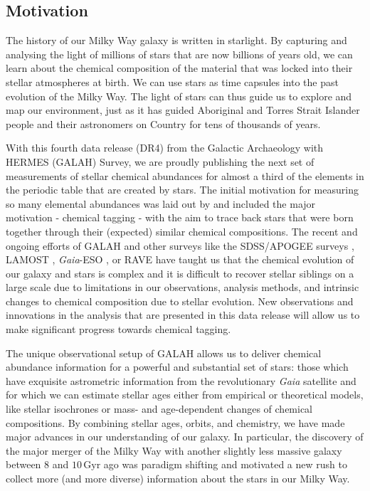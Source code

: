 \documentclass[
  journal=pasa,
  manuscript=research-paper, %
  year=2024,
  volume=37
]{cup-journal}
\newcommand{\Gaia}{\textit{Gaia}\xspace}
\begin{document}
\subsection{Motivation} \label{sec:motivation}

The history of our Milky Way galaxy is written in starlight. By capturing and analysing the light of millions of stars that are now billions of years old, we can learn about the chemical composition of the material that was locked into their stellar atmospheres at birth. We can use stars as time capsules into the past evolution of the Milky Way. The light of stars can thus guide us to explore and map our environment, just as it has guided Aboriginal and Torres Strait Islander people and their astronomers on Country for tens of thousands of years.

With this fourth data release (DR4) from the Galactic Archaeology with HERMES (GALAH) Survey, we are proudly publishing the next set of measurements of stellar chemical abundances for almost a third of the elements in the periodic table that are created by stars. The initial motivation for measuring so many elemental abundances was laid out by \citet{DeSilva2015} and included the major motivation - chemical tagging - with the aim to trace back stars that were born together through their (expected) similar chemical compositions. The recent and ongoing efforts of GALAH and other surveys like the SDSS/APOGEE surveys \citep[e.g.][]{SDSSDR17, Kollmeier2017}, LAMOST \citep{Zhao2012}, \Gaia-ESO \citep{Gilmore2022}, or RAVE \citep{Steinmetz2020a} have taught us that the chemical evolution of our galaxy and stars is complex and it is difficult to recover stellar siblings on a large scale due to limitations in our observations, analysis methods, and intrinsic changes to chemical composition due to stellar evolution. New observations and innovations in the analysis that are presented in this data release will allow us to make significant progress towards chemical tagging.

The unique observational setup of GALAH allows us to deliver chemical abundance information for a powerful and substantial set of stars: those which have exquisite astrometric information from the revolutionary \Gaia satellite \citep{Gaia-Collaboration2016} and for which we can estimate stellar ages either from empirical or theoretical models, like stellar isochrones or mass- and age-dependent changes of chemical compositions. By combining stellar ages, orbits, and chemistry, we have made major advances in our understanding of our galaxy. In particular, the discovery of the major merger of the Milky Way with another slightly less massive galaxy between 8 and $10\,\mathrm{Gyr}$ ago \citep{Belokurov2018, Helmi2018} was paradigm shifting and motivated a new rush to collect more (and more diverse) information about the stars in our Milky Way.
\end{document}
